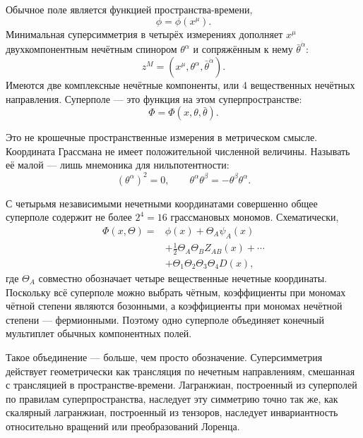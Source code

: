 Обычное поле является функцией пространства-времени,
\begin{equation}
\phi=\phi(x^\mu).
\end{equation}
Минимальная суперсимметрия в четырёх измерениях дополняет \(x^\mu\) двухкомпонентным нечётным спинором \(\theta^\alpha\) и сопряжённым к нему \(\bar\theta^{\dot\alpha}\):
\begin{equation}
z^M=(x^\mu,\theta^\alpha,\bar\theta^{\dot\alpha}).
\end{equation}
Имеются две комплексные нечётные компоненты, или 4 вещественных нечётных направления. Суперполе — это функция на этом суперпространстве:
\begin{equation}
\Phi=\Phi(x,\theta,\bar\theta).
\end{equation}

Это не крошечные пространственные измерения в метрическом смысле. Координата Грассмана не имеет положительной численной величины. Называть её малой — лишь мнемоника для нильпотентности:
\begin{equation}
(\theta^\alpha)^2=0,
\qquad
\theta^\alpha\theta^\beta=-\theta^\beta\theta^\alpha.
\end{equation}

С четырьмя независимыми нечетными координатами совершенно общее суперполе содержит не более \(2^4=16\) грассмановых мономов. Схематически,
\begin{equation}
\begin{aligned}
\Phi(x,\Theta)={}&\phi(x)+\Theta_A\psi_A(x)\\
&+\frac{1}{2}\Theta_A\Theta_B Z_{AB}(x)+\cdots\\
&+\Theta_1\Theta_2\Theta_3\Theta_4D(x),
\end{aligned}
\end{equation}
где \(\Theta_A\) совместно обозначает четыре вещественные нечетные координаты. Поскольку всё суперполе можно выбрать чётным, коэффициенты при мономах чётной степени являются бозонными, а коэффициенты при мономах нечётной степени — фермионными. Поэтому одно суперполе объединяет конечный мультиплет обычных компонентных полей.

Такое объединение — больше, чем просто обозначение. Суперсимметрия действует геометрически как трансляция по нечетным направлениям, смешанная с трансляцией в пространстве-времени. Лагранжиан, построенный из суперполей по правилам суперпространства, наследует эту симметрию точно так же, как скалярный лагранжиан, построенный из тензоров, наследует инвариантность относительно вращений или преобразований Лоренца.

